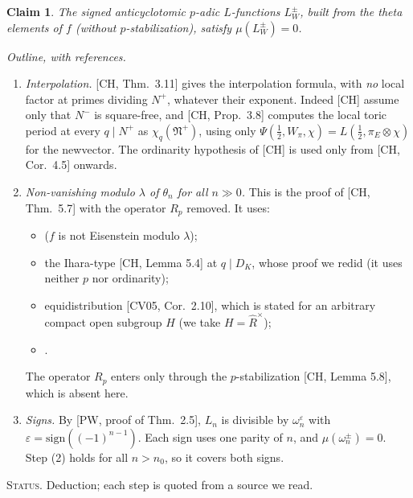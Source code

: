 \documentclass[11pt]{amsart}
\newtheorem{claim}[theorem]{Claim}
\theoremstyle{definition}
\theoremstyle{remark}
\newcommand{\status}[1]{\par\smallskip\noindent\textsc{Status.} #1\par\smallskip}
\begin{document}
\begin{claim}\label{claim:mu}
The signed anticyclotomic $p$-adic $L$-functions $L^\pm_W$, built from the theta elements of $f$ (without $p$-stabilization), satisfy $\mu(L^\pm_W)=0$.
\end{claim}
\noindent\emph{Outline, with references.}
\begin{enumerate}[label=(\arabic*)]
\item \emph{Interpolation.} [CH, Thm.~3.11] gives the interpolation formula, with \emph{no} local factor at primes dividing $N^+$, whatever their exponent. Indeed [CH] assume only that $N^-$ is square-free, and [CH, Prop.~3.8] computes the local toric period at every $q\mid N^+$ as $\chi_q(\mathfrak N^+)$, using only $\Psi(\tfrac12,W_\pi,\chi)=L(\tfrac12,\pi_E\otimes\chi)$ for the newvector. The ordinarity hypothesis of [CH] is used only from [CH, Cor.~4.5] onwards.
\item \emph{Non-vanishing modulo $\lambda$ of $\theta_n$ for all $n\gg0$.} This is the proof of [CH, Thm.~5.7] with the operator $R_p$ removed. It uses:
 \begin{itemize}
 \item [CH, Lemma 5.6] ($f$ is not Eisenstein modulo $\lambda$);
 \item the Ihara-type [CH, Lemma 5.4] at $q\mid D_K$, whose proof we redid (it uses neither $p$ nor ordinarity);
 \item equidistribution [CV05, Cor.~2.10], which is stated for an arbitrary compact open subgroup $H$ (we take $H=\hat R^\times$);
 \item [CH, Cor.~5.2].
 \end{itemize}
 The operator $R_p$ enters only through the $p$-stabilization [CH, Lemma 5.8], which is absent here.
\item \emph{Signs.} By [PW, proof of Thm.~2.5], $L_n$ is divisible by $\omega_n^\varepsilon$ with $\varepsilon=\mathrm{sign}((-1)^{n-1})$. Each sign uses one parity of $n$, and $\mu(\omega_n^\pm)=0$. Step (2) holds for all $n>n_0$, so it covers both signs.
\end{enumerate}
\status{Deduction; each step is quoted from a source we read.}
\end{document}
